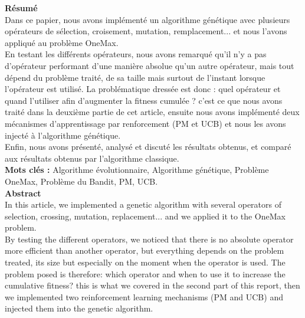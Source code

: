 \documentclass[12pt]{article}
\begin{document}

\newpage
\renewcommand\headrulewidth{1 pt}
\setcounter{page}{1}

\textbf{Résumé}\\

Dans ce papier, nous avons implémenté un algorithme génétique avec plusieurs opérateurs de sélection, croisement, mutation, remplacement... et nous l'avons appliqué au problème OneMax.\\

En testant les différents opérateurs, nous avons remarqué qu'il n'y a pas d'opérateur performant d'une manière absolue qu'un autre opérateur, mais tout dépend du problème traité, de sa taille mais surtout de l'instant lorsque l'opérateur est utilisé. La problématique dressée est donc : quel opérateur et quand l'utiliser afin d'augmenter la fitness cumulée ? c'est ce que nous avons traité dans la deuxième partie de cet article, ensuite nous avons implémenté deux mécanismes d'apprentissage par renforcement (PM et UCB) et nous les avons injecté à l'algorithme génétique.\\

Enfin, nous avons présenté, analysé et discuté les résultats obtenus, et comparé aux résultats obtenus par l'algorithme classique.\\ 

\textbf{Mots clés : } Algorithme évolutionnaire, Algorithme génétique, Problème OneMax, Problème du Bandit, PM, UCB.\\

\textbf{Abstract}\\

In this article, we implemented a genetic algorithm with several operators of selection, crossing, mutation, replacement... and we applied it to the OneMax problem.\\

By testing the different operators, we noticed that there is no absolute operator more efficient than another operator, but everything depends on the problem treated, its size but especially on the moment when the operator is used. The problem posed is therefore: which operator and when to use it to increase the cumulative fitness? this is what we covered in the second part of this report, then we implemented two reinforcement learning mechanisms (PM and UCB) and injected them into the genetic algorithm.\\
\end{document}
